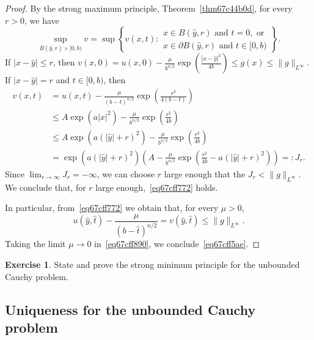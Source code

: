 \documentclass[a4paper,9pt]{amsart}
\newcommand{\de}{\partial}		%
\theoremstyle{plain}
\theoremstyle{definition}
\newtheorem{exercise}[proposition]{Exercise}%
\theoremstyle{remark}
\begin{document}
\begin{proof}
	By the strong maximum principle, Theorem~\ref{thm67c44b0d},
	for every $r>0$, we have
	\begin{equation}
		\sup_{B(\hat y,r)\times[0,b)}v
		=
		\sup\left\{ v(x,t) : 
		\begin{array}{l}
			x\in B(\hat y,r)\text{ and }t=0,\text{ or } \\
			x\in\de B(\hat y,r)\text{ and }t\in[0,b)
		\end{array}
		\right\} .
	\end{equation}
	If $|x-\hat y|\le r$, then 
	$v(x,0) = u(x,0) - \frac{\mu}{b^{n/2}} \exp\left(  \frac{|x-\hat y|^2}{4b} \right)
	\le g(x) \le \|g\|_{L^\infty}$.
	If $|x-\hat y|=r$ and $t\in[0,b)$, then 
	\begin{align*}
	 	v(x,t) 
		&= u(x,t) - \frac{\mu}{(b-t)^{n/2}} \exp\left( \frac{r^2}{4(b-t)} \right) \\
		&\le A\exp(a|x|^2) - \frac{\mu}{b^{n/2}} \exp\left(  \frac{r^2}{4b} \right) \\
		&\le A\exp(a(|\hat y|+r)^2) - \frac{\mu}{b^{n/2}} \exp\left(  \frac{r^2}{4b} \right) \\
		&= \exp(a(|\hat y|+r)^2) \left( A - \frac{\mu}{b^{n/2}} \exp\left(  \frac{r^2}{4b} - a (|\hat y|+r)^2 \right) \right) =: J_r .
	\end{align*}
	Since $\lim_{r\to\infty} J_r = -\infty$, 
	we can choose $r$ large enough that the $J_r < \|g\|_{L^\infty}$.
	We conclude that, for $r$ large enough,~\eqref{eq67cff772} holds.
	
	In particular, from~\eqref{eq67cff772} we obtain that, for every $\mu>0$,
	\begin{equation}\label{eq67cff890}
		u( \hat y,\hat t) - \frac{\mu}{(b-\hat t)^{n/2}}
		= v( \hat y,\hat t)
		\le \|g\|_{L^\infty} .
	\end{equation}
	Taking the limit $\mu\to0$ in~\eqref{eq67cff890}, we conclude~\eqref{eq67cff5ae}.
\end{proof}

\begin{exercise}\label{ex67c45e75}
	State and prove the strong minimum principle for the unbounded Cauchy problem.
\end{exercise}

\subsection{Uniqueness for the unbounded Cauchy problem}\label{subs67c45ca2}
\end{document}
